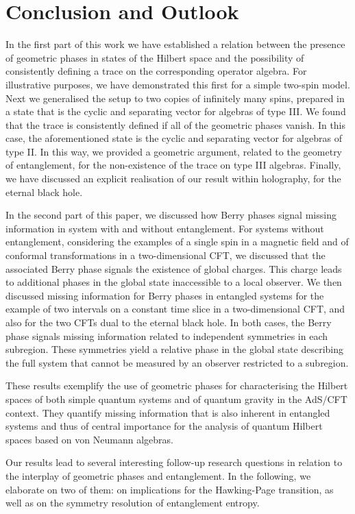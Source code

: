 \documentclass[a4paper,11pt]{article}
\newcommand{\1}{\mathds{1}}
\begin{document}
\section{Conclusion and Outlook}

In the first part of this work we have established a relation between the presence of geometric phases in states of the Hilbert space and the possibility of consistently defining a trace on the corresponding operator algebra. For illustrative purposes, we have demonstrated this first for a simple two-spin model. Next we generalised the setup to two copies of infinitely many spins, prepared in a state that is the cyclic and separating vector for algebras of type III. We found that the trace is consistently defined if all of the geometric phases vanish. In this case, the aforementioned state is the cyclic and separating vector for algebras of type II. In this way, we provided a geometric argument, related to the geometry of entanglement, for the non-existence of the trace on type III algebras. Finally, we have discussed an explicit realisation of our result within holography, for the eternal black hole.

In the second part of this paper, we discussed how Berry phases signal missing information in system with and without entanglement. For systems without entanglement, considering the examples of a single spin in a magnetic field and of conformal transformations in a two-dimensional CFT, we discussed that the associated Berry phase signals the existence of global charges. This charge leads to additional phases in the global state inaccessible to a local observer. We then discussed missing information for Berry phases in entangled systems for the example of two intervals on a constant time slice in a two-dimensional CFT, and also for the two CFTs dual to the eternal black hole. In both cases, the Berry phase signals missing information related to independent symmetries in each subregion. These symmetries yield a relative phase in the global state describing the full system that cannot be measured by an observer restricted to a subregion.

These results exemplify the use of geometric phases for characterising the Hilbert spaces of both simple quantum systems and of quantum gravity in the AdS/CFT context. They quantify missing information that is also inherent in entangled systems and thus of central importance for the analysis of quantum Hilbert spaces based on von Neumann algebras.

Our results lead to several interesting follow-up research questions in relation to the interplay of geometric phases and entanglement. In the following, we elaborate on two of them: on implications for the Hawking-Page transition, as well as on the symmetry resolution of entanglement entropy.
\end{document}
